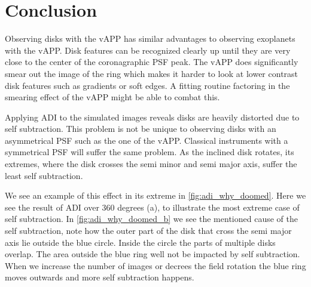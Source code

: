 
%

\section{Conclusion}

Observing disks with the \ac{vAPP} has similar advantages to observing exoplanets with the \ac{vAPP}. Disk features can be recognized clearly up until they are very close to the center of the coronagraphic \ac{PSF} peak. The \ac{vAPP} does significantly smear out the image of the ring which makes it harder to look at lower contrast disk features such as gradients or soft edges. A fitting routine factoring in the smearing effect of the \ac{vAPP} might be able to combat this.

Applying \ac{ADI} to the simulated images reveals disks are heavily distorted due to self subtraction. This problem is not be unique to observing disks with an asymmetrical \ac{PSF} such as the one of the \ac{vAPP}. Classical instruments with a symmetrical \ac{PSF} will suffer the same problem. As the inclined disk rotates, its extremes, where the disk crosses the semi minor and semi major axis, suffer the least self subtraction.

We see an example of this effect in its extreme in \autoref{fig:adi_why_doomed}. Here we see the result of \ac{ADI} over 360 degrees (a), to illustrate the most extreme case of self subtraction. In \autoref{fig:adi_why_doomed_b} we see the mentioned cause of the self subtraction, note how the outer part of the disk that cross the semi major axis lie outside the blue circle. Inside the circle the parts of multiple disks overlap. The area outside the blue ring well not be impacted by self subtraction. When we increase the number of images or decrees the field rotation the blue ring moves outwards and more self subtraction happens.

